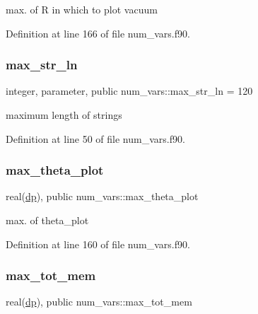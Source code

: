 max. of {\ttfamily R} in which to plot vacuum 



Definition at line 166 of file num\+\_\+vars.\+f90.

\mbox{\label{namespacenum__vars_a3ff2bb983ee80a6735277d6789e6ce7c}} 
\subsubsection{\texorpdfstring{max\+\_\+str\+\_\+ln}{max\_str\_ln}}
{\footnotesize\ttfamily integer, parameter, public num\+\_\+vars\+::max\+\_\+str\+\_\+ln = 120}



maximum length of strings 



Definition at line 50 of file num\+\_\+vars.\+f90.

\mbox{\label{namespacenum__vars_ade6d14ac98ba7f573ef83194808f68b8}} 
\subsubsection{\texorpdfstring{max\+\_\+theta\+\_\+plot}{max\_theta\_plot}}
{\footnotesize\ttfamily real(\hyperlink{namespacenum__vars_a03802aa2bd86439d7a9370836fabf3f2}{dp}), public num\+\_\+vars\+::max\+\_\+theta\+\_\+plot}



max. of {\ttfamily theta\+\_\+plot} 



Definition at line 160 of file num\+\_\+vars.\+f90.

\mbox{\label{namespacenum__vars_ae50396b7028248358850b4524cf84433}} 
\subsubsection{\texorpdfstring{max\+\_\+tot\+\_\+mem}{max\_tot\_mem}}
{\footnotesize\ttfamily real(\hyperlink{namespacenum__vars_a03802aa2bd86439d7a9370836fabf3f2}{dp}), public num\+\_\+vars\+::max\+\_\+tot\+\_\+mem}



